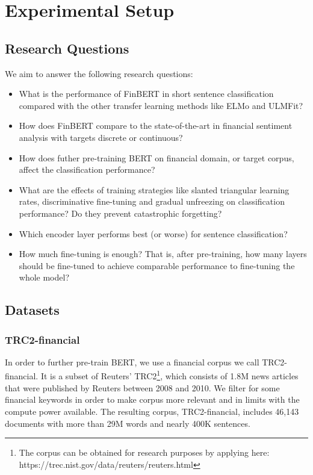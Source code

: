 \documentclass[../main.tex]{subfiles}
\begin{document}
\section{Experimental Setup} \label{exp_setup}


\subsection{Research Questions} \label{research_questions}
We aim to answer the following research questions:
\begin{itemize}
    \item[(RQ1)] What is the performance of FinBERT in short sentence classification compared with the other transfer learning methods like ELMo and ULMFit?
    \item[(RQ2)] How does FinBERT compare to the state-of-the-art in financial sentiment analysis with targets discrete or continuous? 
    \item[(RQ3)] How does futher pre-training BERT on financial domain, or target corpus, affect the classification performance?
    \item[(RQ4)] What are the effects of training strategies like slanted triangular learning rates, discriminative fine-tuning and gradual unfreezing on classification performance? Do they prevent catastrophic forgetting? 
    \item[(RQ5)] Which encoder layer performs best (or worse) for sentence classification?
    \item[(RQ6)] How much fine-tuning is enough? That is, after pre-training, how many layers should be fine-tuned to achieve comparable performance to fine-tuning the whole model?
\end{itemize}

\subsection{Datasets} \label{dataset}

\subsubsection{TRC2-financial} \label{trc2}
In order to further pre-train BERT, we use a financial corpus we call TRC2-financial. It is a subset of Reuters' TRC2\footnote{The corpus can be obtained for research purposes by applying here: https://trec.nist.gov/data/reuters/reuters.html}, which consists of 1.8M news articles that were published by Reuters between 2008 and 2010. We filter for some financial keywords in order to make corpus more relevant and in limits with the compute power available. The resulting corpus, TRC2-financial, includes 46,143 documents with more than 29M words and nearly 400K sentences.
\end{document}
